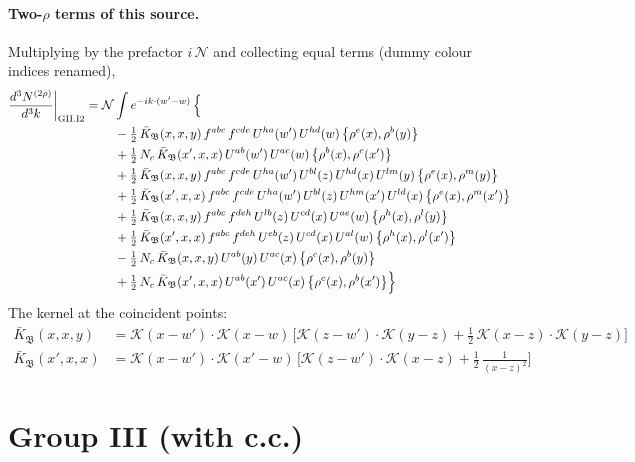 \documentclass[10pt]{article}
\numberwithin{equation}{section}
\newcommand{\KK}{\mathcal K}
\newcommand{\NN}{\mathcal N}
\begin{document}
\paragraph{Two-$\rho$ terms of this source.} Multiplying by the prefactor $i\,\NN$ and collecting equal terms (dummy colour indices renamed),
\begin{align}
\frac{d^3N^{(2\rho)}}{d^3k}\bigg|_{\rm GII.I2}={}&\NN\int e^{-ik\cdot(w'-w)}\,\Big\{\notag\\
&\quad -\tfrac12\,\bar K_{\mathfrak B}(x,x,y)\,f^{abc}\,f^{cde}\,U^{ha}(w')\,U^{hd}(w)\,\big\{\rho^{e}(x),\rho^{b}(y)\big\}\notag\\
&\quad +\tfrac12\,N_{c}\,\bar K_{\mathfrak B}(x',x,x)\,U^{ab}(w')\,U^{ac}(w)\,\big\{\rho^{b}(x),\rho^{c}(x')\big\}\notag\\
&\quad +\tfrac12\,\bar K_{\mathfrak B}(x,x,y)\,f^{abc}\,f^{cde}\,U^{ha}(w')\,U^{bl}(z)\,U^{hd}(x)\,U^{lm}(y)\,\big\{\rho^{e}(x),\rho^{m}(y)\big\}\notag\\
&\quad +\tfrac12\,\bar K_{\mathfrak B}(x',x,x)\,f^{abc}\,f^{cde}\,U^{ha}(w')\,U^{bl}(z)\,U^{hm}(x')\,U^{ld}(x)\,\big\{\rho^{e}(x),\rho^{m}(x')\big\}\notag\\
&\quad +\tfrac12\,\bar K_{\mathfrak B}(x,x,y)\,f^{abc}\,f^{deh}\,U^{lb}(z)\,U^{cd}(x)\,U^{ae}(w)\,\big\{\rho^{h}(x),\rho^{l}(y)\big\}\notag\\
&\quad +\tfrac12\,\bar K_{\mathfrak B}(x',x,x)\,f^{abc}\,f^{deh}\,U^{eb}(z)\,U^{cd}(x)\,U^{al}(w)\,\big\{\rho^{h}(x),\rho^{l}(x')\big\}\notag\\
&\quad -\tfrac12\,N_{c}\,\bar K_{\mathfrak B}(x,x,y)\,U^{ab}(y)\,U^{ac}(x)\,\big\{\rho^{c}(x),\rho^{b}(y)\big\}\notag\\
&\quad +\tfrac12\,N_{c}\,\bar K_{\mathfrak B}(x',x,x)\,U^{ab}(x')\,U^{ac}(x)\,\big\{\rho^{c}(x),\rho^{b}(x')\big\}\Big\}\label{R:eq:res-GII.I2}
\end{align}
The kernel at the coincident points:
\begin{align*}
\bar K_{\mathfrak B}(x,x,y)&=\KK(x-w')\cdot\KK(x-w)\,\Big[\KK(z-w')\cdot\KK(y-z)+\tfrac12\,\KK(x-z)\cdot\KK(y-z)\Big]\\\bar K_{\mathfrak B}(x',x,x)&=\KK(x-w')\cdot\KK(x'-w)\,\Big[\KK(z-w')\cdot\KK(x-z)+\tfrac12\,\frac{1}{(x-z)^2}\Big]
\end{align*}

\section{Group III (with c.c.)}\label{R:sec:G3}
\end{document}
